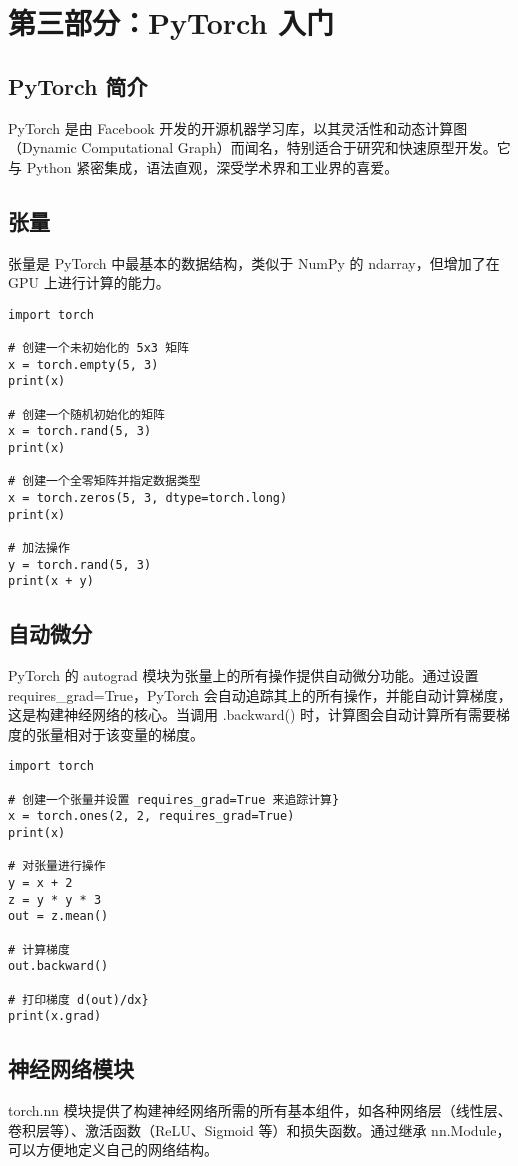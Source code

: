 \documentclass[UTF8]{gyh}
\begin{document}
\section{第三部分：PyTorch 入门}
\subsection{PyTorch 简介}
PyTorch 是由 Facebook 开发的开源机器学习库，以其灵活性和动态计算图（Dynamic Computational Graph）而闻名，特别适合于研究和快速原型开发。它与 Python 紧密集成，语法直观，深受学术界和工业界的喜爱。

\subsection{张量}
张量是 PyTorch 中最基本的数据结构，类似于 NumPy 的 ndarray，但增加了在 GPU 上进行计算的能力。

\begin{lstlisting}
import torch

# 创建一个未初始化的 5x3 矩阵
x = torch.empty(5, 3)
print(x)

# 创建一个随机初始化的矩阵
x = torch.rand(5, 3)
print(x)

# 创建一个全零矩阵并指定数据类型
x = torch.zeros(5, 3, dtype=torch.long)
print(x)

# 加法操作
y = torch.rand(5, 3)
print(x + y)
\end{lstlisting}

\subsection{自动微分}
PyTorch 的 autograd 模块为张量上的所有操作提供自动微分功能。通过设置 requires_grad=True，PyTorch 会自动追踪其上的所有操作，并能自动计算梯度，这是构建神经网络的核心。当调用 .backward() 时，计算图会自动计算所有需要梯度的张量相对于该变量的梯度。

\begin{lstlisting}
import torch

# 创建一个张量并设置 requires_grad=True 来追踪计算}
x = torch.ones(2, 2, requires_grad=True)
print(x)

# 对张量进行操作
y = x + 2
z = y * y * 3
out = z.mean()

# 计算梯度
out.backward()

# 打印梯度 d(out)/dx}
print(x.grad)
\end{lstlisting}

\subsection{神经网络模块}
torch.nn 模块提供了构建神经网络所需的所有基本组件，如各种网络层（线性层、卷积层等）、激活函数（ReLU、Sigmoid 等）和损失函数。通过继承 nn.Module，可以方便地定义自己的网络结构。
\end{document}
